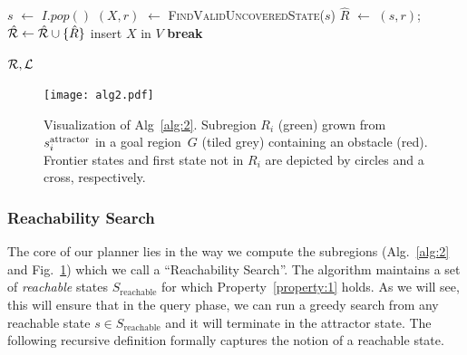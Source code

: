 \documentclass[a4paper,10pt]{article}
\begin{document}
\begin{algorithm}[t]
\begin{algorithmic}[1]
\vspace{2mm}        
        
         \label{alg:1:iv_loop}
            \State $s$ $\leftarrow$ $I.pop()$
            
\State $(X, r)$ $\leftarrow$ \textsc{FindValidUncoveredState}($s$)
                \State $\hat{R}$ $\leftarrow$ $(s,r)$;
        \hspace{2mm}
        $\hat{\mathcal{R}} \leftarrow \hat{\mathcal{R}} \cup \{ \hat{R} \}$   \label{alg:1:iv_region}
                    \label{alg:1:x_states}
                    \State insert $X$ in $V$
                    \State \textbf{break} \label{alg:1:break}
                \EndIf
            \EndIf
        \EndWhile
    \EndWhile

  \vspace{2mm}

  \State \Return $\mathcal{R}, \mathcal{L}$
\EndProcedure
\end{algorithmic}
\end{algorithm}

\begin{figure}[tb]
  \centering
    \texttt{[image: alg2.pdf]}
  \caption{
  Visualization of Alg~\ref{alg:2}. Subregion $R_i$ (green) grown from $s^{\text{attractor}}_i$ in a goal region~$G$ (tiled grey) containing an obstacle (red).
  Frontier states and first state not in $R_i$ are depicted by circles and a cross, respectively.
}
    \label{fig:alg2}
\end{figure}

\subsubsection{Reachability Search}
The core of our planner lies in the way we compute the subregions (Alg.~\ref{alg:2} and Fig.~\ref{fig:alg2}) which we call a ``Reachability Search''. The algorithm maintains a set of \emph{reachable} states $S_{\text{reachable}}$ for which Property~\ref{property:1} holds.
As we will see, this will ensure that in the query phase, we can run a greedy search from any reachable state $s \in S_{\text{reachable}}$ and it will terminate in the attractor state. 
%
The following recursive definition formally captures the notion of a reachable state.
\end{document}
